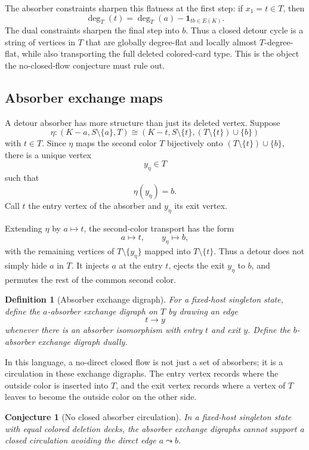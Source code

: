 \documentclass[11pt]{article}
\newtheorem{conjecture}{Conjecture}
\newtheorem{definition}{Definition}
\newcommand{\one}{\mathbf{1}}
\begin{document}
The absorber constraints sharpen this flatness at the first step: if
\(x_1=t\in T\), then
\[
  \deg_T(t)=\deg_T(a)-\one_{tb\in E(K)}.
\]
The dual constraints sharpen the final step into \(b\).  Thus a closed detour
cycle is a string of vertices in \(T\) that are globally degree-flat and
locally almost \(T\)-degree-flat, while also transporting the full deleted
colored-card type.  This is the object the no-closed-flow conjecture must
rule out.

\subsection{Absorber exchange maps}

A detour absorber has more structure than just its deleted vertex.  Suppose
\[
  \eta:
  (K-a,S\setminus\{a\},T)
  \cong
  (K-t,S\setminus\{t\},(T\setminus\{t\})\cup\{b\})
\]
with \(t\in T\).  Since \(\eta\) maps the second color \(T\) bijectively onto
\((T\setminus\{t\})\cup\{b\}\), there is a unique vertex
\[
  y_\eta\in T
\]
such that
\[
  \eta(y_\eta)=b.
\]
Call \(t\) the entry vertex of the absorber and \(y_\eta\) its exit vertex.

Extending \(\eta\) by \(a\mapsto t\), the second-color transport has the form
\[
  a\mapsto t,\qquad y_\eta\mapsto b,
\]
with the remaining vertices of \(T\setminus\{y_\eta\}\) mapped into
\(T\setminus\{t\}\).  Thus a detour does not simply hide \(a\) in \(T\).  It
injects \(a\) at the entry \(t\), ejects the exit \(y_\eta\) to \(b\), and
permutes the rest of the common second color.

\begin{definition}[Absorber exchange digraph]
For a fixed-host singleton state, define the \(a\)-absorber exchange digraph
on \(T\) by drawing an edge
\[
  t\longrightarrow y
\]
whenever there is an absorber isomorphism with entry \(t\) and exit \(y\).
Define the \(b\)-absorber exchange digraph dually.
\end{definition}

In this language, a no-direct closed flow is not just a set of absorbers; it
is a circulation in these exchange digraphs.  The entry vertex records where
the outside color is inserted into \(T\), and the exit vertex records where a
vertex of \(T\) leaves to become the outside color on the other side.

\begin{conjecture}[No closed absorber circulation]
In a fixed-host singleton state with equal colored deletion decks, the
absorber exchange digraphs cannot support a closed circulation avoiding the
direct edge \(a\leadsto b\).
\end{conjecture}
\end{document}

